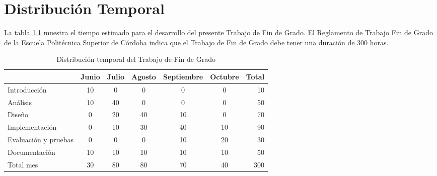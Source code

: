 \chapter{Distribución Temporal}\label{c-distribuciontemporal}

La tabla \ref{tabla:distribucion-temporal} muestra el tiempo estimado para el desarrollo del presente Trabajo de Fin de Grado. El Reglamento de Trabajo Fin de Grado de la Escuela Politécnica Superior de Córdoba \cite{reglamentotfg} indica que el Trabajo de Fin de Grado debe tener una duración de 300 horas. 

\begin{table}[H]
    \centering
    \caption{Distribución temporal del Trabajo de Fin de Grado}\label{tabla:distribucion-temporal}
    \begin{tabular}{l|ccccc|r}
                     & Junio & Julio & Agosto & Septiembre & Octubre  & Total     \\ \hline
  Introducción         & 10 &  0  &  0  & 0  & 0  &  10  \\
  Análisis             & 10 & 40  &  0  & 0  & 0  &  50  \\
  Diseño               & 0  & 20  & 40  & 10 & 0  &  70  \\
  Implementación       & 0  & 10  & 30  & 40 & 10 &  90  \\
  Evaluación y pruebas & 0  &  0  &  0  & 10 & 20 &  30  \\
  Documentación        & 10 & 10  & 10  & 10 & 10 &  50  \\ \hline
  Total mes            & 30 & 80  & 80  & 70 & 40 & 300  
\end{tabular}
\end{table}